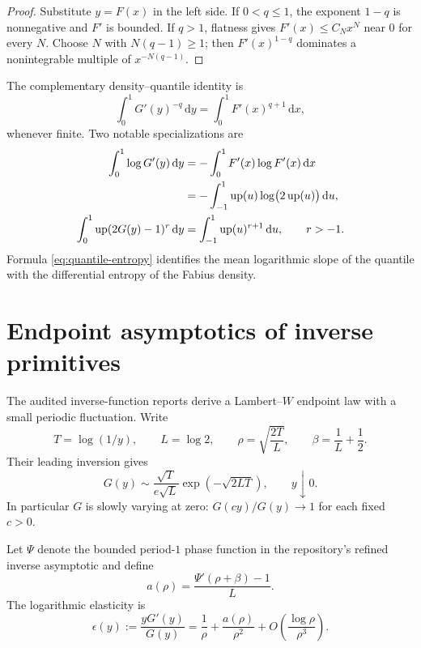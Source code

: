 \documentclass[11pt,oneside]{article}
\theoremstyle{definition}
\theoremstyle{remark}
\newcommand{\dd}{\,\mathrm d}
\newcommand{\upf}{\operatorname{up}}
\begin{document}
\begin{proof}
Substitute $y=F(x)$ in the left side.  If $0<q\le1$, the exponent $1-q$ is nonnegative and $F'$ is bounded.  If $q>1$, flatness gives $F'(x)\le C_Nx^N$ near $0$ for every $N$.  Choose $N$ with $N(q-1)\ge1$; then $F'(x)^{1-q}$ dominates a nonintegrable multiple of $x^{-N(q-1)}$.
\end{proof}

The complementary density--quantile identity is
\begin{equation}\label{eq:inverse-density-power}
 \int_0^1G'(y)^{-q}\dd y
 =\int_0^1F'(x)^{q+1}\dd x,
\end{equation}
whenever finite.  Two notable specializations are
\begin{align}
 \int_0^1\log G'(y)\dd y
 &=-\int_0^1F'(x)\log F'(x)\dd x\notag\\
 &=-\int_{-1}^{1}\upf(u)\log\bigl(2\upf(u)\bigr)\dd u,
 \label{eq:quantile-entropy}\\
 \int_0^1\upf(2G(y)-1)^r\dd y
 &=\int_{-1}^{1}\upf(u)^{r+1}\dd u,
 \qquad r>-1.\label{eq:inverse-up-power}
\end{align}
Formula \eqref{eq:quantile-entropy} identifies the mean logarithmic slope of the quantile with the differential entropy of the Fabius density.

\section{Endpoint asymptotics of inverse primitives}

The audited inverse-function reports derive a Lambert--$W$ endpoint law with a small periodic fluctuation.  Write
\begin{equation}\label{eq:rho-definition}
 T=\log(1/y),\qquad L=\log2,
 \qquad \rho=\sqrt{\frac{2T}{L}},
 \qquad \beta=\frac1L+\frac12.
\end{equation}
Their leading inversion gives
\begin{equation}\label{eq:G-leading-endpoint}
 G(y)\sim \frac{\sqrt T}{e\sqrt L}
 \exp\!\left(-\sqrt{2LT}\right),
 \qquad y\downarrow0.
\end{equation}
In particular $G$ is slowly varying at zero: $G(cy)/G(y)\to1$ for each fixed $c>0$.

Let $\Psi$ denote the bounded period-$1$ phase function in the repository's refined inverse asymptotic and define
\begin{equation}\label{eq:a-rho}
 a(\rho)=\frac{\Psi'(\rho+\beta)-1}{L}.
\end{equation}
The logarithmic elasticity is
\begin{equation}\label{eq:epsilon-expansion}
 \epsilon(y):=\frac{yG'(y)}{G(y)}
 =\frac1\rho+\frac{a(\rho)}{\rho^2}
 +O\!\left(\frac{\log\rho}{\rho^3}\right).
\end{equation}
\end{document}
